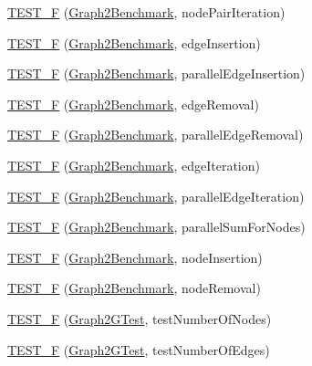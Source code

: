 \begin{DoxyCompactItemize}
\item 
\hyperlink{namespace_networ_kit_addea5bddd0f76b73a69418ab374aeb40}{T\-E\-S\-T\-\_\-\-F} (\hyperlink{class_networ_kit_1_1_graph2_benchmark}{Graph2\-Benchmark}, node\-Pair\-Iteration)
\item 
\hyperlink{namespace_networ_kit_a4b123ae13e55b0533142a9d1c6b60caa}{T\-E\-S\-T\-\_\-\-F} (\hyperlink{class_networ_kit_1_1_graph2_benchmark}{Graph2\-Benchmark}, edge\-Insertion)
\item 
\hyperlink{namespace_networ_kit_adf410e709ed17519970ebf03e53f2287}{T\-E\-S\-T\-\_\-\-F} (\hyperlink{class_networ_kit_1_1_graph2_benchmark}{Graph2\-Benchmark}, parallel\-Edge\-Insertion)
\item 
\hyperlink{namespace_networ_kit_acd247c8b4b026c4a297fd53a73391348}{T\-E\-S\-T\-\_\-\-F} (\hyperlink{class_networ_kit_1_1_graph2_benchmark}{Graph2\-Benchmark}, edge\-Removal)
\item 
\hyperlink{namespace_networ_kit_a18662ed16cf9b2e99641cd08ff2b417b}{T\-E\-S\-T\-\_\-\-F} (\hyperlink{class_networ_kit_1_1_graph2_benchmark}{Graph2\-Benchmark}, parallel\-Edge\-Removal)
\item 
\hyperlink{namespace_networ_kit_a4921bb3d2d4c7a7415bb0e4474543d62}{T\-E\-S\-T\-\_\-\-F} (\hyperlink{class_networ_kit_1_1_graph2_benchmark}{Graph2\-Benchmark}, edge\-Iteration)
\item 
\hyperlink{namespace_networ_kit_a4a4197d41cab8dc526b7b75c0deeaedd}{T\-E\-S\-T\-\_\-\-F} (\hyperlink{class_networ_kit_1_1_graph2_benchmark}{Graph2\-Benchmark}, parallel\-Edge\-Iteration)
\item 
\hyperlink{namespace_networ_kit_a6eb766d3a47181885b899b7d8f6ffba3}{T\-E\-S\-T\-\_\-\-F} (\hyperlink{class_networ_kit_1_1_graph2_benchmark}{Graph2\-Benchmark}, parallel\-Sum\-For\-Nodes)
\item 
\hyperlink{namespace_networ_kit_a14d70cf5024154e21fa9889eeda6958a}{T\-E\-S\-T\-\_\-\-F} (\hyperlink{class_networ_kit_1_1_graph2_benchmark}{Graph2\-Benchmark}, node\-Insertion)
\item 
\hyperlink{namespace_networ_kit_a5a01fa79b966fd0999b90b75b56e7d7b}{T\-E\-S\-T\-\_\-\-F} (\hyperlink{class_networ_kit_1_1_graph2_benchmark}{Graph2\-Benchmark}, node\-Removal)
\item 
\hyperlink{namespace_networ_kit_a68b5958ff9c52ac3f38f0cd54125ae99}{T\-E\-S\-T\-\_\-\-F} (\hyperlink{class_networ_kit_1_1_graph2_g_test}{Graph2\-G\-Test}, test\-Number\-Of\-Nodes)
\item 
\hyperlink{namespace_networ_kit_a1c5826f9d4dc45c864c2cd135e7e49aa}{T\-E\-S\-T\-\_\-\-F} (\hyperlink{class_networ_kit_1_1_graph2_g_test}{Graph2\-G\-Test}, test\-Number\-Of\-Edges)

\end{DoxyCompactItemize}

